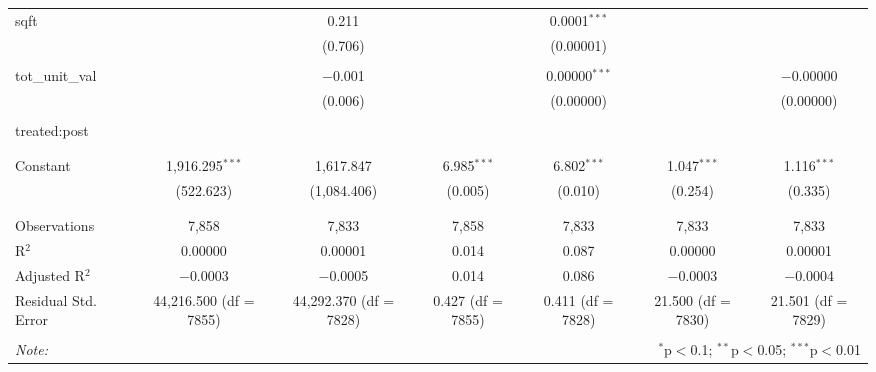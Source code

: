 \begin{table}[H]
{\begin{tabular}{@{\extracolsep{5pt}}lcccccc}
  sqft &  & 0.211 &  & 0.0001$^{***}$ &  &  \\  

   &  & (0.706) &  & (0.00001) &  &  \\  

   & & & & & & \\  

  tot\_unit\_val &  & $-$0.001 &  & 0.00000$^{***}$ &  & $-$0.00000 \\  

   &  & (0.006) &  & (0.00000) &  & (0.00000) \\  

   & & & & & & \\  

  treated:post &  &  &  &  &  &  \\  

   &  &  &  &  &  &  \\  

   & & & & & & \\  

  Constant & 1,916.295$^{***}$ & 1,617.847 & 6.985$^{***}$ & 6.802$^{***}$ & 1.047$^{***}$ & 1.116$^{***}$ \\  

   & (522.623) & (1,084.406) & (0.005) & (0.010) & (0.254) & (0.335) \\  

   & & & & & & \\  

 \hline \\[-1.8ex]  

 Observations & 7,858 & 7,833 & 7,858 & 7,833 & 7,833 & 7,833 \\  

 R$^{2}$ & 0.00000 & 0.00001 & 0.014 & 0.087 & 0.00000 & 0.00001 \\  

 Adjusted R$^{2}$ & $-$0.0003 & $-$0.0005 & 0.014 & 0.086 & $-$0.0003 & $-$0.0004 \\  

 Residual Std. Error & 44,216.500 (df = 7855) & 44,292.370 (df = 7828) & 0.427 (df = 7855) & 0.411 (df = 7828) & 21.500 (df = 7830) & 21.501 (df = 7829) \\  

 \hline  

 \hline \\[-1.8ex]  

 \textit{Note:}  & \multicolumn{6}{r}{$^{*}$p$<$0.1; $^{**}$p$<$0.05; $^{***}$p$<$0.01} \\  

 \end{tabular}}  

 \end{table}  

